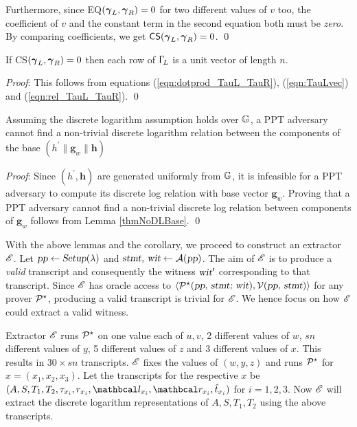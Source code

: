   Furthermore, since \textsf{EQ}$(\vecnb{\gamma}_L, \vecnb{\gamma}_R)=0$ for two different values of $v$ too, the coefficient of $v$ and the constant term in the second equation both must be \textit{zero}.  
  By comparing coefficients, we get $\textsf{CS}(\vecnb{\gamma}_L, \vecnb{\gamma}_R)=0$. \hfill{\small \qed}
  
  \begin{lemma}\label{lemTauLBinary}
    If \textsf{CS}$(\vecnb{\gamma}_L, \vecnb{\gamma}_R) = 0$ then each row of $\Upgamma_L$ is a unit vector of length $n$.
  \end{lemma}
  \textit{Proof}: This follows from equations (\ref{eqn:dotprod_TauL_TauR}), (\ref{eqn:TauLvec}) and (\ref{eqn:rel_TauL_TauR}). \hfill{\small \qed}
  
  \begin{corollary}\label{corollaryNoDL}
    Assuming the discrete logarithm assumption holds over $\G$, a \textsf{PPT} adversary cannot find a non-trivial discrete logarithm relation between the components of the base $(h^{\prime}\|\textbf{g}_w \| \textbf{h})$
  \end{corollary}
  \textit{Proof}: Since $(h^{\prime}, \textbf{h})$ are generated uniformly from $\G$, it is infeasible for a PPT adversary to compute its discrete log relation with base vector $\textbf{g}_w$.
  Proving that a \textsf{PPT} adversary cannot find a non-trivial discrete log relation between components of $\textbf{g}_w$ follows from Lemma \ref{thmNoDLBase}. \hfill{\small \qed}
  
  
  With the above lemmas and the corollary, we proceed to construct an extractor $\E$. 
  Let $\textsl{pp} \leftarrow \textsl{Setup}(\lambda)$ and $\textsl{stmt, wit} \leftarrow \mathcal{A}(\textsl{pp})$.
  The aim of $\E$ is to produce a \textit{valid} transcript and consequently the witness $\textsl{wit}^{\prime}$ corresponding to that transcript.
  Since $\E$ has oracle access to $\langle \P^{\star}(\textsl{pp, stmt; wit}), \V(\textsl{pp, stmt}) \rangle$ for any prover $\P^{\star}$, producing a valid transcript
  is trivial for $\E$. We hence focus on how $\E$ could extract a valid witness. 
  
  Extractor $\E$ runs $\P^{\star}$ on one value each of $u, v$, 2 different values of $w$, $sn$ different values of $y$,
  5 different values of $z$ and 3 different values of $x$. This results in $30\times sn$ transcripts.
  $\E$ fixes the values of $(w,y,z)$ and runs $\P^{\star}$ for $x=(x_1,x_2,x_3)$. Let the transcripts for the respective $x$ be $(A, S, T_1, T_2, \tau_{x_i}, r_{x_i}, \lvec_{x_i}, \rvec_{x_i}, \hat{t}_{x_i})$ for $i=1,2,3$. Now $\E$ will extract the discrete logarithm representations of $A, S, T_1, T_2$ using the above transcripts.\\
  
